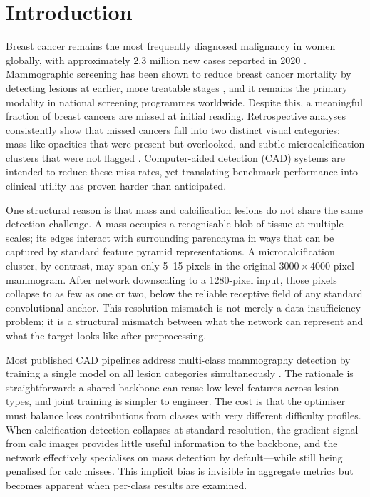 \documentclass[runningheads]{llncs}
\begin{document}

\section{Introduction}
\label{sec:introduction}

Breast cancer remains the most frequently diagnosed malignancy in women
globally, with approximately 2.3 million new cases reported in 2020
\cite{sung2021global}. Mammographic screening has been shown to reduce
breast cancer mortality by detecting lesions at earlier, more treatable
stages \cite{tabar2003swedish}, and it remains the primary modality in
national screening programmes worldwide. Despite this, a meaningful
fraction of breast cancers are missed at initial reading. Retrospective
analyses consistently show that missed cancers fall into two distinct
visual categories: mass-like opacities that were present but overlooked,
and subtle microcalcification clusters that were not flagged
\cite{doi2007computer}. Computer-aided detection (CAD) systems are
intended to reduce these miss rates, yet translating benchmark
performance into clinical utility has proven harder than anticipated.

One structural reason is that mass and calcification lesions do not
share the same detection challenge. A mass occupies a recognisable blob
of tissue at multiple scales; its edges interact with surrounding
parenchyma in ways that can be captured by standard feature pyramid
representations. A microcalcification cluster, by contrast, may span
only 5--15 pixels in the original $3000 \times 4000$ pixel mammogram.
After network downscaling to a 1280-pixel input, those pixels collapse
to as few as one or two, below the reliable receptive field of any
standard convolutional anchor. This resolution mismatch is not merely a
data insufficiency problem; it is a structural mismatch between what the
network can represent and what the target looks like after preprocessing.

Most published CAD pipelines address multi-class mammography detection
by training a single model on all lesion categories simultaneously
\cite{ribli2018detecting}. The rationale is straightforward: a shared
backbone can reuse low-level features across lesion types, and joint
training is simpler to engineer. The cost is that the optimiser must
balance loss contributions from classes with very different difficulty
profiles. When calcification detection collapses at standard resolution,
the gradient signal from calc images provides little useful information
to the backbone, and the network effectively specialises on mass
detection by default---while still being penalised for calc misses.
This implicit bias is invisible in aggregate metrics but becomes apparent
when per-class results are examined.
\end{document}
